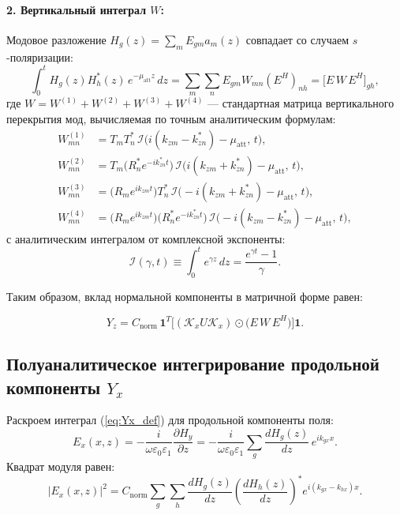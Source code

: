 \documentclass[a4paper,11pt]{article}
\begin{document}
\paragraph{2. Вертикальный интеграл $W$:}
Модовое разложение $H_g(z) = \sum_m E_{gm} a_m(z)$ совпадает со случаем $s$-поляризации:
\begin{equation}
    \int_0^t H_g(z) H_h^*(z) \, e^{-\mu_{\text{att}} z} \, dz = \sum_m \sum_n E_{gm} W_{mn} (E^H)_{nh} = \big[ E \, W \, E^H \big]_{gh},
\end{equation}
где $W = W^{(1)} + W^{(2)} + W^{(3)} + W^{(4)}$ — стандартная матрица вертикального перекрытия мод, вычисляемая по точным аналитическим формулам:
\begin{align}
    W_{mn}^{(1)} &= T_m T_n^* \, \mathcal{I}\big( i(k_{zm} - k_{zn}^*) - \mu_{\text{att}}, \, t \big), \\[0.3em]
    W_{mn}^{(2)} &= T_m \big(R_n^* e^{-i k_{zn}^* t}\big) \, \mathcal{I}\big( i(k_{zm} + k_{zn}^*) - \mu_{\text{att}}, \, t \big), \\[0.3em]
    W_{mn}^{(3)} &= \big(R_m e^{i k_{zm} t}\big) T_n^* \, \mathcal{I}\big( -i(k_{zm} + k_{zn}^*) - \mu_{\text{att}}, \, t \big), \\[0.3em]
    W_{mn}^{(4)} &= \big(R_m e^{i k_{zm} t}\big) \big(R_n^* e^{-i k_{zn}^* t}\big) \, \mathcal{I}\big( -i(k_{zm} - k_{zn}^*) - \mu_{\text{att}}, \, t \big),
\end{align}
с аналитическим интегралом от комплексной экспоненты:
\begin{equation}
    \mathcal{I}(\gamma, t) \equiv \int_0^t e^{\gamma z} \, dz = \frac{e^{\gamma t} - 1}{\gamma}.
\end{equation}

Таким образом, вклад нормальной компоненты в матричной форме равен:
\begin{mathbox}
\begin{equation}
    Y_z = C_{\text{norm}} \, \mathbf{1}^T \Big[ (\mathcal{K}_x U \mathcal{K}_x) \odot \big( E \, W \, E^H \big) \Big] \mathbf{1}.
    \label{eq:Yz_final}
\end{equation}
\end{mathbox}

\subsection{Полуаналитическое интегрирование продольной компоненты \texorpdfstring{$Y_x$}{Yx}}

Раскроем интеграл (\ref{eq:Yx_def}) для продольной компоненты поля:
\begin{equation}
    E_x(x, z) = -\frac{i}{\omega \varepsilon_0 \varepsilon_1} \frac{\partial H_y}{\partial z} = -\frac{i}{\omega \varepsilon_0 \varepsilon_1} \sum_g \frac{d H_g(z)}{dz} \, e^{i k_{gx} x}.
\end{equation}
Квадрат модуля равен:
\begin{equation}
    |E_x(x, z)|^2 = C_{\text{norm}} \sum_g \sum_h \frac{d H_g(z)}{dz} \left( \frac{d H_h(z)}{dz} \right)^* e^{i (k_{gx} - k_{hx}) x}.
\end{equation}
\end{document}
